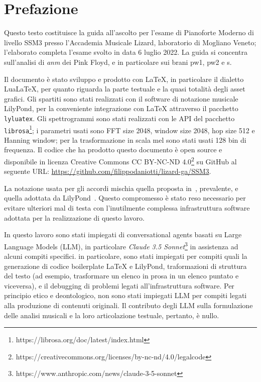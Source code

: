 \documentclass[class=book, crop=false, oneside, 12pt]{standalone}
\begin{document}
\chapter*{Prefazione}

Questo testo costituisce la guida all'ascolto per l'esame di Pianoforte Moderno di livello SSM3 presso l'Accademia Musicale Lizard, laboratorio di Mogliano Veneto; l'elaborato completa l'esame svolto in data 6 luglio 2022. La guida si concentra sull'analisi di \emph{\acrlong{anm}} dei Pink Floyd, e in particolare sui brani \acrlong{pw1}, \acrlong{pw2} e \acrlong{s}.

Il documento è stato sviluppo e prodotto con LaTeX, in particolare il dialetto LuaLaTeX, per quanto riguarda la parte testuale e la quasi totalità degli asset grafici. Gli spartiti sono stati realizzati con il software di notazione musicale LilyPond, per la conveniente integrazione con LaTeX attraverso il pacchetto \texttt{lyluatex}. Gli spettrogrammi sono stati realizzati con le API del pacchetto \texttt{librosa}\footnote{https://librosa.org/doc/latest/index.html}; i parametri usati sono FFT size 2048, window size 2048, hop size 512 e Hanning window; per la trasformazione in scala mel sono stati usati 128 bin di frequenza. Il codice che ha prodotto questo documento è open source e disponibile in licenza Creative Commons CC BY-NC-ND 4.0\footnote{https://creativecommons.org/licenses/by-nc-nd/4.0/legalcode} su GitHub al seguente URL: \url{https://github.com/filippodaniotti/lizard-ga/SSM3}.

La notazione usata per gli accordi mischia quella proposta in~\cite{brachi2008armonia}, prevalente, e quella adottata da LilyPond~\cite{res:lily-chord-chart}. Questo compromesso è stato reso necessario per evitare ulteriori mal di testa con l'inutilmente complessa infrastruttura software adottata per la realizzazione di questo lavoro.

In questo lavoro sono stati impiegati di conversational agents basati su Large Language Models (LLM), in particolare \emph{Claude 3.5 Sonnet}\footnote{https://www.anthropic.com/news/claude-3-5-sonnet} in assistenza ad alcuni compiti specifici. in particolare, sono stati impiegati per compiti quali la generazione di codice boilerplate LaTeX e LilyPond, traformazioni di struttura del testo (ad esempio, trasformare un elenco in prosa in un elenco puntato e viceversa), e il debugging di problemi legati all'infrastruttura software. Per principio etico e deontologico, non sono stati impiegati LLM per compiti legati alla produzione di contenuti originali. Il contributo degli LLM sulla formulazione delle analisi musicali e la loro articolazione testuale, pertanto, è nullo.
\end{document}

